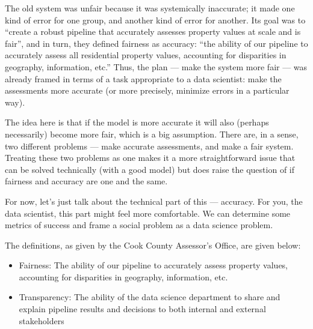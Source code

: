 \documentclass[
  letterpaper,
  DIV=11,
  numbers=noendperiod]{scrreprt}
\providecommand{\tightlist}{%
  \setlength{\itemsep}{0pt}\setlength{\parskip}{0pt}}\usepackage{longtable,booktabs,array}
\begin{document}
The old system was unfair because it was systemically inaccurate; it
made one kind of error for one group, and another kind of error for
another. Its goal was to ``create a robust pipeline that accurately
assesses property values at scale and is fair'', and in turn, they
defined fairness as accuracy: ``the ability of our pipeline to
accurately assess all residential property values, accounting for
disparities in geography, information, etc.'' Thus, the plan --- make
the system more fair --- was already framed in terms of a task
appropriate to a data scientist: make the assessments more accurate (or
more precisely, minimize errors in a particular way).

The idea here is that if the model is more accurate it will also
(perhaps necessarily) become more fair, which is a big assumption. There
are, in a sense, two different problems --- make accurate assessments,
and make a fair system. Treating these two problems as one makes it a
more straightforward issue that can be solved technically (with a good
model) but does raise the question of if fairness and accuracy are one
and the same.

For now, let's just talk about the technical part of this --- accuracy.
For you, the data scientist, this part might feel more comfortable. We
can determine some metrics of success and frame a social problem as a
data science problem.

\begin{tcolorbox}[enhanced jigsaw, coltitle=black, leftrule=.75mm, left=2mm, bottomrule=.15mm, bottomtitle=1mm, opacityback=0, breakable, arc=.35mm, opacitybacktitle=0.6, toptitle=1mm, title=\textcolor{quarto-callout-tip-color}{\faLightbulb}\hspace{0.5em}{Definitions: Fairness and Transparency}, colbacktitle=quarto-callout-tip-color!10!white, titlerule=0mm, rightrule=.15mm, colframe=quarto-callout-tip-color-frame, toprule=.15mm, colback=white]

The definitions, as given by the Cook County Assessor's Office, are
given below:

\begin{itemize}
\tightlist
\item
  Fairness: The ability of our pipeline to accurately assess property
  values, accounting for disparities in geography, information, etc.
\item
  Transparency: The ability of the data science department to share and
  explain pipeline results and decisions to both internal and external
  stakeholders
\end{itemize}

\end{tcolorbox}
\end{document}
